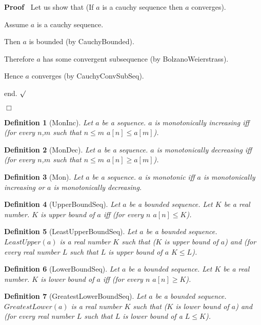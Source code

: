 \documentclass{article}
\newenvironment{forthel}{\begin{leftbar}}{\end{leftbar}}
\newenvironment{proof}{\noindent\textbf{Proof\ }}{\hspace*{\fill}$\Box$\medskip}
\newenvironment{subproof}{\begin{list}{}{}
		\item[\text{Proof}]}{\hfill $\surd$ \end{list}}
\newtheorem{definition}{Definition}
\begin{document}
\begin{forthel}
\begin{proof}
		Let us show that (If $a$ is a cauchy sequence then $a$ converges).
		
		\begin{subproof}
			Assume $a$ is a cauchy sequence.
			
			Then $a$ is bounded (by CauchyBounded).
			
			Therefore $a$ has some convergent subsequence (by BolzanoWeierstrass).
			
			Hence $a$ converges (by CauchyConvSubSeq).
			
			end.
		\end{subproof}
	\end{proof}
	
	
	\begin{definition}[MonInc]
		Let $a$ be a sequence. $a$ is monotonically increasing iff (for every $n$,$m$ such that $n \leq m$ $a[n] \leq a[m]$).
	\end{definition}
	
	\begin{definition}[MonDec]
		Let $a$ be a sequence. $a$ is monotonically decreasing iff (for every $n$,$m$ such that $n \leq m$ $a[n] \geq a[m]$).
	\end{definition}
	
	\begin{definition}[Mon]
		Let $a$ be a sequence. $a$ is monotonic iff $a$ is monotonically increasing or $a$ is monotonically decreasing.
	\end{definition}
	
	\begin{definition}[UpperBoundSeq]
		Let $a$ be a bounded sequence. Let $K$ be a real number. $K$ is upper bound of $a$ iff (for every $n$ $a[n] \leq K$).
	\end{definition}
	
	\begin{definition}[LeastUpperBoundSeq]
		Let $a$ be a bounded sequence. $LeastUpper(a)$ is a real number $K$ such that ($K$ is upper bound of $a$) and 
		(for every real number $L$ such that $L$ is upper bound of $a$ $K \leq L$).
	\end{definition}
	
	\begin{definition}[LowerBoundSeq]
		Let $a$ be a bounded sequence. Let $K$ be a real number. $K$ is lower bound of $a$ iff (for every $n$ $a[n] \geq K$).
	\end{definition}
	
	\begin{definition}[GreatestLowerBoundSeq]
		Let $a$ be a bounded sequence. $GreatestLower(a)$ is a real number $K$ such that ($K$ is lower bound of $a$) and
		(for every real number $L$ such that $L$ is lower bound of a $L \leq K$).
	\end{definition}
	

\end{forthel}
\end{document}
